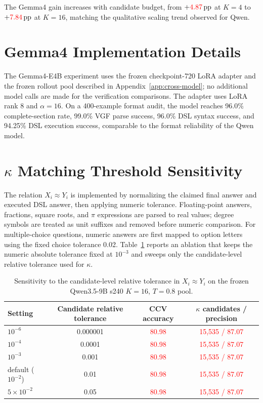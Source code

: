 \documentclass{article}
\newcommand{\ccv}{\textsc{CCV}}
\newcommand{\pp}{\,\text{pp}}
\newcommand{\recheck}[1]{\textcolor{red}{#1}}
\begin{document}
The Gemma4 gain increases with candidate budget, from $+\recheck{4.87}\pp$ at $K{=}4$ to $+\recheck{7.84}\pp$ at $K{=}16$, matching the qualitative scaling trend observed for Qwen.

\section{Gemma4 Implementation Details}
\label{app:gemma-implementation}

The Gemma4-E4B experiment uses the frozen checkpoint-720 LoRA adapter and the frozen rollout pool described in Appendix~\ref{app:cross-model}; no additional model calls are made for the verification comparisons. The adapter uses LoRA rank 8 and $\alpha=16$. On a 400-example format audit, the model reaches 96.0\% complete-section rate, 99.0\% VGF parse success, 96.0\% DSL syntax success, and 94.25\% DSL execution success, comparable to the format reliability of the Qwen model.

\section{$\kappa$ Matching Threshold Sensitivity}
\label{app:kappa-threshold}

The relation $X_i\approx Y_i$ is implemented by normalizing the claimed final answer and executed DSL answer, then applying numeric tolerance. Floating-point answers, fractions, square roots, and $\pi$ expressions are parsed to real values; degree symbols are treated as unit suffixes and removed before numeric comparison. For multiple-choice questions, numeric answers are first mapped to option letters using the fixed choice tolerance 0.02. Table~\ref{tab:kappa-threshold} reports an ablation that keeps the numeric absolute tolerance fixed at $10^{-3}$ and sweeps only the candidate-level relative tolerance used for $\kappa$.

\begin{table}[h]
\centering
\caption{Sensitivity to the candidate-level relative tolerance in $X_i\approx Y_i$ on the frozen Qwen3.5-9B s240 $K{=}16$, $T{=}0.8$ pool.}
\label{tab:kappa-threshold}
\small
\begin{tabular}{lccc}
\toprule
Setting & Candidate relative tolerance & \ccv{} accuracy & $\kappa$ candidates / precision \\
\midrule
$10^{-6}$ & 0.000001 & \recheck{80.98} & \recheck{15,535 / 87.07} \\
$10^{-4}$ & 0.0001 & \recheck{80.98} & \recheck{15,535 / 87.07} \\
$10^{-3}$ & 0.001 & \recheck{80.98} & \recheck{15,535 / 87.07} \\
default ($10^{-2}$) & 0.01 & \recheck{80.98} & \recheck{15,535 / 87.07} \\
$5{\times}10^{-2}$ & 0.05 & \recheck{80.98} & \recheck{15,535 / 87.07} \\
\bottomrule
\end{tabular}
\end{table}
\end{document}
